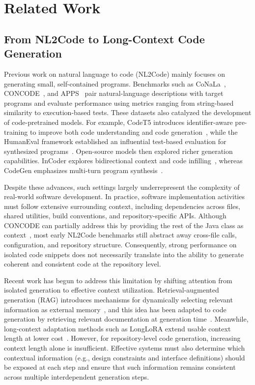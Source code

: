 \documentclass[format=acmsmall, review=false, screen=true]{acmart}
\begin{document}
\section{Related Work}\label{sec:related}

\subsection{From NL2Code to Long-Context Code Generation}
Previous work on natural language to code (NL2Code) mainly focuses on generating small, self-contained programs. Benchmarks such as CoNaLa~\cite{Yin2018Conala}, CONCODE~\cite{Iyer2018Concode}, and APPS~\cite{Hendrycks2021APPS} pair natural-language descriptions with target programs and evaluate performance using metrics ranging from string-based similarity to execution-based tests. These datasets also catalyzed the development of code-pretrained models. For example, CodeT5 introduces identifier-aware pre-training to improve both code understanding and code generation~\cite{Wang2021CodeT5}, while the HumanEval framework established an influential test-based evaluation for synthesized programs~\cite{Chen2021Codex}. Open-source models then explored richer generation capabilities. InCoder explores bidirectional context and code infilling~\cite{Fried2022InCoder}, whereas CodeGen emphasizes multi-turn program synthesis~\cite{Nijkamp2022CodeGen}.

Despite these advances, such settings largely underrepresent the complexity of real-world software development. In practice, software implementation activities must follow extensive surrounding context, including dependencies across files, shared utilities, build conventions, and repository-specific APIs. Although CONCODE can partially address this by providing the rest of the Java class as context~\cite{Iyer2018Concode}, most early NL2Code benchmarks still abstract away cross-file calls, configuration, and repository structure. Consequently, strong performance on isolated code snippets does not necessarily translate into the ability to generate coherent and consistent code at the repository level.

Recent work has begun to address this limitation by shifting attention from isolated generation to effective context utilization. Retrieval-augmented generation (RAG) introduces mechanisms for dynamically selecting relevant information as external memory~\cite{Lewis2020RAG}, and this idea has been adapted to code generation by retrieving relevant documentation at generation time~\cite{Zhou2023DocPrompting}. Meanwhile, long-context adaptation methods such as LongLoRA extend usable context length at lower cost~\cite{Chen2023LongLoRA}. However, for repository-level code generation, increasing context length alone is insufficient. Effective systems must also determine which contextual information (e.g., design constraints and interface definitions) should be exposed at each step and ensure that such information remains consistent across multiple interdependent generation steps.
\end{document}
